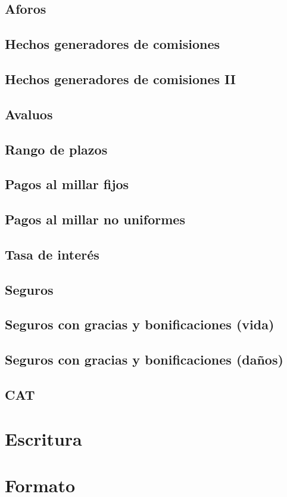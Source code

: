 \documentclass{report}
\begin{document}
\subsection{Aforos}
\subsection{Hechos generadores de comisiones}
\subsection{Hechos generadores de comisiones II}
\subsection{Avaluos}
\subsection{Rango de plazos}
\subsection{Pagos al millar fijos}
\subsection{Pagos al millar no uniformes}
\subsection{Tasa de interés}
\subsection{Seguros}
\subsection{Seguros con gracias y bonificaciones (vida)}
\subsection{Seguros con gracias y bonificaciones (daños)}
\subsection{CAT}

\section{Escritura}
\section{Formato}
\end{document}
